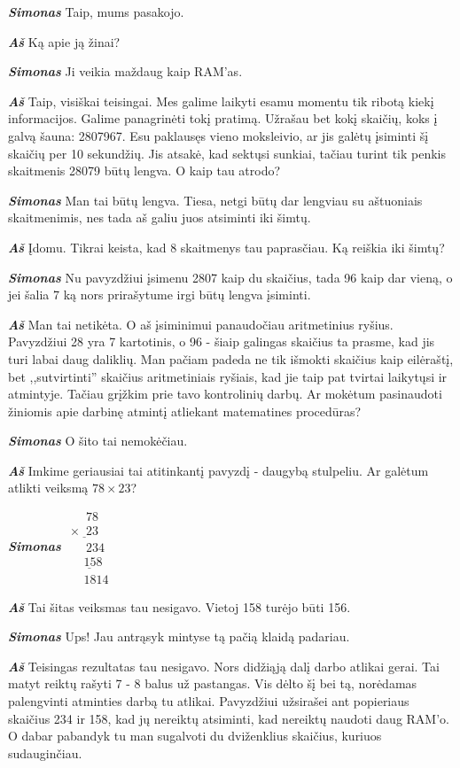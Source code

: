 \documentclass[a4paper]{article}
\newcommand{\say}[1]{\textbf{\textit{#1}}}
\begin{document}
\say{Simonas} Taip, mums pasakojo.

\say{Aš} Ką apie ją žinai?

\say{Simonas} Ji veikia maždaug kaip RAM'as.

\say{Aš} Taip, visiškai teisingai. Mes galime laikyti esamu momentu tik ribotą kiekį informacijos. Galime panagrinėti tokį pratimą. Užrašau bet kokį skaičių, koks į galvą šauna: 2807967. Esu paklausęs vieno moksleivio, ar jis galėtų įsiminti šį skaičių per 10 sekundžių. Jis atsakė, kad sektųsi sunkiai, tačiau turint tik penkis skaitmenis 28079 būtų lengva. O kaip tau atrodo?

\say{Simonas} Man tai būtų lengva. Tiesa, netgi būtų dar lengviau su aštuoniais skaitmenimis, nes tada aš galiu juos atsiminti iki šimtų.

\say{Aš} Įdomu. Tikrai keista, kad 8 skaitmenys tau paprasčiau. Ką reiškia iki šimtų?

\say{Simonas} Nu pavyzdžiui įsimenu 2807 kaip du skaičius, tada 96 kaip dar vieną, o jei šalia 7 ką nors prirašytume irgi būtų lengva įsiminti.

\say{Aš} Man tai netikėta. O aš įsiminimui panaudočiau aritmetinius ryšius. Pavyzdžiui 28 yra 7 kartotinis, o 96 - šiaip galingas skaičius ta prasme, kad jis turi labai daug daliklių. Man pačiam padeda ne tik išmokti skaičius kaip eilėraštį, bet ,,sutvirtinti'' skaičius aritmetiniais ryšiais, kad jie taip pat tvirtai laikytųsi ir atmintyje. Tačiau grįžkim prie tavo kontrolinių darbų. Ar mokėtum pasinaudoti žiniomis apie darbinę atmintį atliekant matematines procedūras?

\say{Simonas} O šito tai nemokėčiau.

\say{Aš}  Imkime geriausiai tai atitinkantį pavyzdį - daugybą stulpeliu. Ar galėtum atlikti veiksmą $78 \times 23$?

\say{Simonas} $\begin{array}{c}
\phantom{\times0}78\\
\underline{\times\phantom{0}23}\\
\phantom{\times0}234\\
\underline{\phantom\times158\phantom0}\\
\phantom\times1814
\end{array}$

\say{Aš} Tai šitas veiksmas tau nesigavo. Vietoj 158 turėjo būti 156.

\say{Simonas} Ups! Jau antrąsyk mintyse tą pačią klaidą padariau. 

\say{Aš} Teisingas rezultatas tau nesigavo. Nors didžiąją dalį darbo atlikai gerai. Tai matyt reiktų rašyti 7 - 8 balus už pastangas. Vis dėlto šį bei tą, norėdamas palengvinti atminties darbą tu atlikai. Pavyzdžiui užsirašei ant popieriaus skaičius 234 ir 158, kad jų nereiktų atsiminti, kad nereiktų naudoti daug RAM'o. O dabar pabandyk tu man sugalvoti du dviženklius skaičius, kuriuos sudauginčiau.
\end{document}
